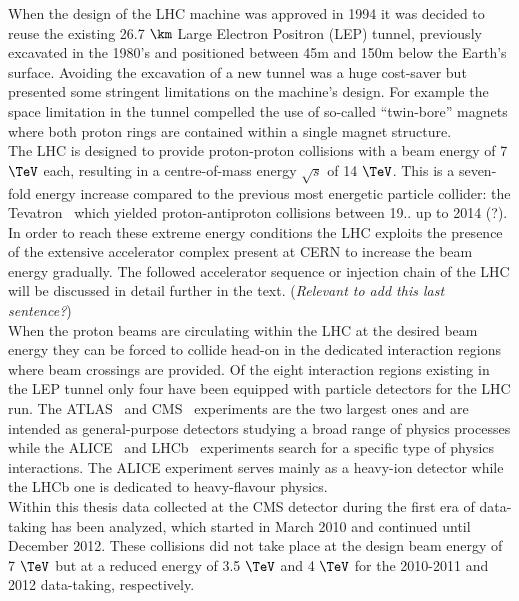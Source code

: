 When the design of the LHC machine was approved in 1994 it was decided to reuse the existing 26.7 $\km$ Large Electron Positron (LEP) tunnel, previously excavated in the 1980's and positioned between 45m and 150m below the Earth's surface.
Avoiding the excavation of a new tunnel was a huge cost-saver but presented some stringent limitations on the machine's design. For example the space limitation in the tunnel compelled the use of so-called ``twin-bore'' magnets where both proton rings are contained within a single magnet structure.
\\
The LHC is designed to provide proton-proton collisions with a beam energy of 7 $\TeV$ each, resulting in a centre-of-mass energy $\sqrt{s}$ of 14 $\TeV$. This is a seven-fold energy increase compared to the previous most energetic particle collider: the Tevatron~\cite{} which yielded proton-antiproton collisions between 19.. up to 2014 (?). In order to reach these extreme energy conditions the LHC exploits the presence of the extensive accelerator complex present at CERN to increase the beam energy gradually. The followed accelerator sequence or injection chain of the LHC will be discussed in detail further in the text. (\textit{Relevant to add this last sentence?})
\\
When the proton beams are circulating within the LHC at the desired beam energy they can be forced to collide head-on in the dedicated interaction regions where beam crossings are provided. Of the eight interaction regions existing in the LEP tunnel only four have been equipped with particle detectors for the LHC run. The ATLAS~\cite{} and CMS~\cite{} experiments are the two largest ones and are intended as general-purpose detectors studying a broad range of physics processes while the ALICE~\cite{} and LHCb~\cite{} experiments search for a specific type of physics interactions. The ALICE experiment serves mainly as a heavy-ion detector while the LHCb one is dedicated to heavy-flavour physics.
\\
Within this thesis data collected at the CMS detector during the first era of data-taking has been analyzed, which started in March 2010 and continued until December 2012. These collisions did not take place at the design beam energy of 7 $\TeV$ but at a reduced energy of 3.5 $\TeV$ and 4 $\TeV$ for the 2010-2011 and 2012 data-taking, respectively.

